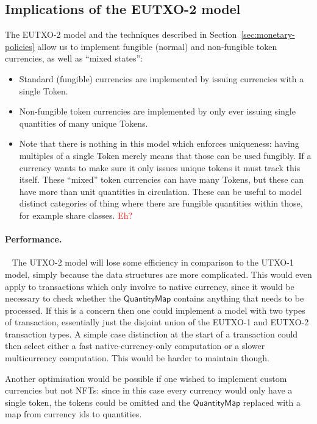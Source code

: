 \documentclass[a4paper]{article}
\newcommand{\todokwxm}[1]{\todo[inline,color=blue!20,author=kwxm]{#1}}
\newcommand{\red}[1]{\textcolor{red}{#1}}
\newcommand{\s}{\textsf}  %
\theoremstyle{definition}  %
\newcommand{\qtymap}{\ensuremath{\s{QuantityMap}}}
\begin{document}
\subsection{Implications of the EUTXO-2 model}
The EUTXO-2 model and the techniques described in
Section~\ref{sec:monetary-policies} allow us to implement fungible
(normal) and non-fungible token currencies, as well as ``mixed
states'':
\begin{itemize}
\item Standard (fungible) currencies are implemented by issuing
  currencies with a single \s{Token}.
\item Non-fungible token currencies are implemented by only ever
  issuing single quantities of many unique \s{Token}s.
\item Note that there is nothing in this model which enforces
  uniqueness: having multiples of a single \s{Token} merely means that
  those can be used fungibly. If a currency wants to make sure it only
  issues unique tokens it must track this itself.  These ``mixed'' token
  currencies can have many \s{Token}s, but these can have more than unit
  quantities in circulation.  These can be useful to model distinct
  categories of thing where there are fungible quantities within
  those, for example share classes. \red{Eh?}
\end{itemize}

\paragraph{Performance.}
\
\medskip
\todokwxm{Do we care about any of this?}
The UTXO-2 model will lose some efficiency in comparison to the UTXO-1
model, simply because the data structures are more complicated.  This
would even apply to transactions which only involve to native
currency, since it would be necessary to check whether the \qtymap{}
contains anything that needs to be processed.  If this is a concern
then one could implement a model with two types of transaction,
essentially just the disjoint union of the EUTXO-1 and EUTXO-2
transaction types. A simple case distinction at the start of a
transaction could then select either a fast native-currency-only
computation or a slower multicurrency computation.  This would be
harder to maintain though.

\smallskip  Another optimisation would be possible if one wished to
implement custom currencies but not NFTs: since in this case every
currency would only have a single token, the tokens could be omitted
and the $\qtymap$ replaced with a map from currency ids to quantities.
\end{document}
